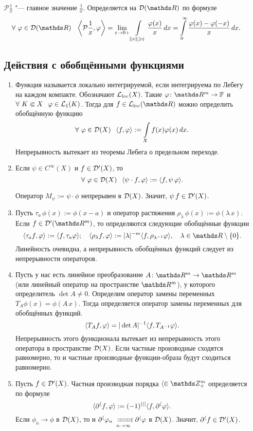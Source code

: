 \begin{Exa}
$\mathcal P\frac1x$ "--- главное значение $\frac1x$. Определяется на $\D(\R)$ по формуле
\[
  \forall\ \phi\in\D(\R)\pau 
  \left\la\mathcal P\frac1x,\phi\right\ra = 
  \yo\e{0+}\Gint{\|x\|\ge\e}\frac{\phi(x)}x\,dx = 
  \int\limits_0^\infty\frac{\phi(x)-\phi(-x)}x\,dx.
\]
\end{Exa}


\subsection{Действия с обобщёнными функциями}
\begin{enumerate} \item
Функция называется локально интегрируемой, если интегрируема по Лебегу на каждом компакте. Обозначают $\mathcal L_{\mathrm{loc}}(X)$. Такие $\phi\colon \R^m\to\F$ и $\forall\ K\Subset X\pau \phi\in\L_1(K)$. Тогда для $f\in \Lloc(\R)$ можно определить обобщённую функцию
\[
  \forall\ \phi\in\D(X)\pau \la f,\phi\ra:=\Gint{X} f(x)\phi(x)\,dx.
\]
Непрерывность вытекает из теоремы Лебега о предельном переходе.

\item Если $\psi\in C^\infty(X)$ и $f\in\mathcal D'(X)$, то
\[
  \forall\ \varphi\in \mathcal D(X)\hskip .75em plus.1em minus.08em\relax \langle\psi\cdot f,\varphi\rangle:=\langle f,\psi\,\varphi\rangle.
\]

Оператор $M_\psi:=\psi\cdot\phi$ непрерывен в $\mathcal D(X)$. Значит, $\psi\,f\in\mathcal D'(X)$.

\item Пусть $\tau_a\,\phi(x):=\phi(x-a)$ и  оператор растяжения $\rho_\lambda\,\phi(x):=\phi(\lambda\, x)$. Если $f\in\D'(\R^m)$, то определяются следующие обобщённые функции 
\[
\la\tau_a f,\phi\ra:=\la f,\tau_a\phi\ra;\quad
 \la\rho_\l f,\phi\ra:=|\lambda|^{-m}\la f,\rho_{\l^{-1}}\phi\ra,\quad\l\in\R\dd\{0\}.
\]
Линейность очевидна, а непрерывность обобщённых функций следует из непрерывности операторов.
\item Пусть у нас есть линейное преобразование $A\colon \R^m\to\R^m$ (или линейный оператор на пространстве $\R^m$), у которого определитель $\det A\ne0$. Определим оператор замены переменных $T_A\phi(x) = \phi(A\,x)$. Тогда определяется оператор замены переменных для обобщённых функций.
\[
  \langle T_Af,\varphi\rangle = |\det A|^{-1}\langle f,T_{A^{-1}}\varphi\rangle.
\]
Непрерывность этого функционала вытекает из непрерывность этого оператора в пространстве $\mathcal D(X)$. Если частные производные сходятся равномерно, то и частные производные функции-образа будут сходиться равномерно.

\item Пусть $f\in\mathcal D'(X)$. Частная производная порядка $\a\in\Z_+^m$ определяется по формуле
\[
  \langle\partial^\langle f,\varphi\rangle:=(-1)^{|\langle|}\langle f,\partial^\langle\varphi\rangle.
\]
Если $\phi_n\to\phi$ в $\mathcal D(X)$, то и $\dl^\a\phi_n\rsh[ ]{n}\dl^\a\phi$ в $\mathcal D(X)$. Значит, $\partial^\langle f\in\mathcal D'(X)$.
\end{enumerate}
